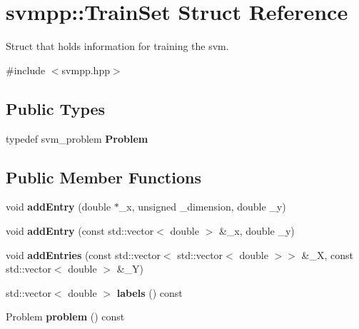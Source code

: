\hypertarget{structsvmpp_1_1TrainSet}{}\section{svmpp\+:\+:Train\+Set Struct Reference}
\label{structsvmpp_1_1TrainSet}


Struct that holds information for training the svm.  




{\ttfamily \#include $<$svmpp.\+hpp$>$}

\subsection*{Public Types}
\begin{DoxyCompactItemize}
\item 
typedef svm\+\_\+problem {\bfseries Problem}\hypertarget{structsvmpp_1_1TrainSet_a039e1cf9720111d60307f1e9a520ef32}{}\label{structsvmpp_1_1TrainSet_a039e1cf9720111d60307f1e9a520ef32}

\end{DoxyCompactItemize}
\subsection*{Public Member Functions}
\begin{DoxyCompactItemize}
\item 
void {\bfseries add\+Entry} (double $\ast$\+\_\+x, unsigned \+\_\+dimension, double \+\_\+y)\hypertarget{structsvmpp_1_1TrainSet_aa11b10f14e308ce82401cc1f374876aa}{}\label{structsvmpp_1_1TrainSet_aa11b10f14e308ce82401cc1f374876aa}

\item 
void {\bfseries add\+Entry} (const std\+::vector$<$ double $>$ \&\+\_\+x, double \+\_\+y)\hypertarget{structsvmpp_1_1TrainSet_af4f1e480d40e9fd5bf561d21312cfc24}{}\label{structsvmpp_1_1TrainSet_af4f1e480d40e9fd5bf561d21312cfc24}

\item 
void {\bfseries add\+Entries} (const std\+::vector$<$ std\+::vector$<$ double $>$$>$ \&\+\_\+X, const std\+::vector$<$ double $>$ \&\+\_\+Y)\hypertarget{structsvmpp_1_1TrainSet_a58e7e75aab79f8719119443f147ec797}{}\label{structsvmpp_1_1TrainSet_a58e7e75aab79f8719119443f147ec797}

\item 
std\+::vector$<$ double $>$ {\bfseries labels} () const \hypertarget{structsvmpp_1_1TrainSet_a0b2c557076b1f9f0e438954b58f62a6b}{}\label{structsvmpp_1_1TrainSet_a0b2c557076b1f9f0e438954b58f62a6b}

\item 
Problem {\bfseries problem} () const \hypertarget{structsvmpp_1_1TrainSet_a27f262ed658575085f93fb4d76842367}{}\label{structsvmpp_1_1TrainSet_a27f262ed658575085f93fb4d76842367}

\end{DoxyCompactItemize}



